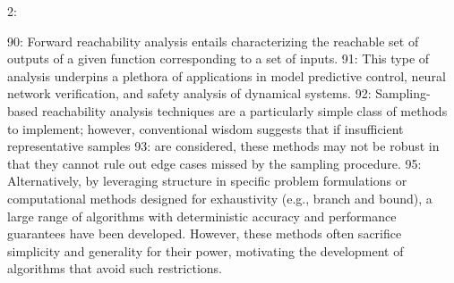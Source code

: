 2: \documentclass[12pt]{l4dc2022} %
\begin{document}
90: Forward reachability analysis entails characterizing the reachable set of outputs of a given function corresponding to a set of inputs.
91: This type of analysis underpins a plethora of applications in model predictive control, neural network verification, and safety analysis of dynamical systems. 
92: Sampling-based reachability analysis techniques are a particularly simple class of methods to implement; however, conventional wisdom suggests that if insufficient representative samples %
93: are considered, these methods may not be robust in that they cannot rule out edge cases missed by the sampling procedure. 
95: Alternatively, by leveraging structure in specific problem formulations or computational methods designed for exhaustivity (e.g., branch and bound), a large range of algorithms with deterministic accuracy and performance guarantees have been developed. However, these methods often sacrifice simplicity and generality for their power, motivating the development of algorithms that avoid such restrictions.
\end{document}

